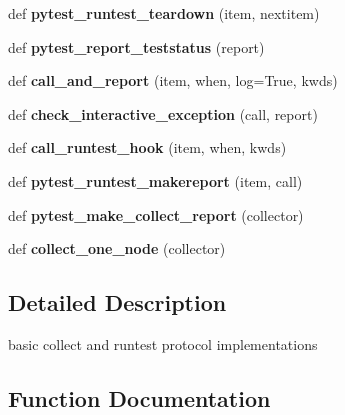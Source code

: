 \begin{DoxyCompactItemize}
def {\bfseries pytest\+\_\+runtest\+\_\+teardown} (item, nextitem)
\item 
\mbox{\label{namespace__pytest_1_1runner_a010fdf8bd785b8c18462c1e2f41acef0}} 
def {\bfseries pytest\+\_\+report\+\_\+teststatus} (report)
\item 
\mbox{\label{namespace__pytest_1_1runner_a71f7009db49f17fcca17ba7597542acc}} 
def {\bfseries call\+\_\+and\+\_\+report} (item, when, log=True, kwds)
\item 
\mbox{\label{namespace__pytest_1_1runner_a65d030f8cfaf3788f8733c5c2527b900}} 
def {\bfseries check\+\_\+interactive\+\_\+exception} (call, report)
\item 
\mbox{\label{namespace__pytest_1_1runner_ad2d2c54aa12b1635e3942748941b36de}} 
def {\bfseries call\+\_\+runtest\+\_\+hook} (item, when, kwds)
\item 
\mbox{\label{namespace__pytest_1_1runner_aee23ac0110f882e8535eb647efbfe91d}} 
def {\bfseries pytest\+\_\+runtest\+\_\+makereport} (item, call)
\item 
\mbox{\label{namespace__pytest_1_1runner_af3ce6a6b24990cb13cfd076c8f9fdcb2}} 
def {\bfseries pytest\+\_\+make\+\_\+collect\+\_\+report} (collector)
\item 
\mbox{\label{namespace__pytest_1_1runner_ade3fc1f067026a522ca81470bd0155de}} 
def {\bfseries collect\+\_\+one\+\_\+node} (collector)
\end{DoxyCompactItemize}


\subsection{Detailed Description}
\begin{DoxyVerb}basic collect and runtest protocol implementations \end{DoxyVerb}
 

\subsection{Function Documentation}
\mbox{\label{namespace__pytest_1_1runner_aa36efa3427e0fd47ace399d7d47794fd}} 
